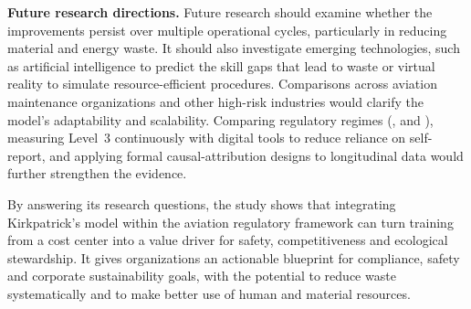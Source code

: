 \textbf{Future research directions.} Future research should examine whether the improvements persist over multiple operational cycles, particularly in reducing material and energy waste. It should also investigate emerging technologies, such as artificial intelligence to predict the skill gaps that lead to waste or virtual reality to simulate resource-efficient procedures. Comparisons across aviation maintenance organizations and other high-risk industries would clarify the model's adaptability and scalability. Comparing regulatory regimes (\FAA{}, \EASA{} and \ANAC{}), measuring Level~3 continuously with digital tools to reduce reliance on self-report, and applying formal causal-attribution designs to longitudinal data would further strengthen the evidence.

By answering its research questions, the study shows that integrating Kirkpatrick's model within the aviation regulatory framework can turn training from a cost center into a value driver for safety, competitiveness and ecological stewardship. It gives \MRO{} organizations an actionable blueprint for compliance, safety and corporate sustainability goals, with the potential to reduce waste systematically and to make better use of human and material resources.
